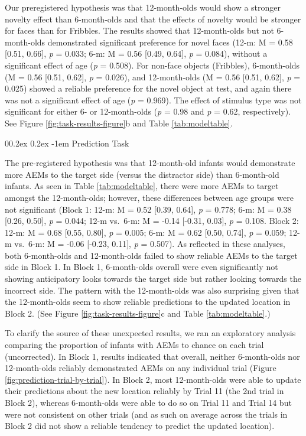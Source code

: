 \documentclass[
  english,
  man,floatsintext]{apa6}
\makeatletter
\let\oldparagraph\paragraph
\renewcommand{\paragraph}{
    \@ifstar
      \xxxParagraphStar
      \xxxParagraphNoStar
  }
\newcommand{\xxxParagraphStar}[1]{\oldparagraph*{#1}\mbox{}}
\newcommand{\xxxParagraphNoStar}[1]{\oldparagraph{#1}\mbox{}}
\renewcommand{\paragraph}{\@startsection{paragraph}{4}{\parindent}%
  {0\baselineskip \@plus 0.2ex \@minus 0.2ex}%
  {-1em}%
  {\normalfont\normalsize\bfseries\itshape\typesectitle}}
\makeatother
\begin{document}
Our preregistered hypothesis was that 12-month-olds would show a stronger novelty effect than 6-month-olds and that the effects of novelty would be stronger for faces than for Fribbles.
The results showed that 12-month-olds but not 6-month-olds demonstrated significant preference for novel faces (12-m: M = 0.58 {[}0.51, 0.66{]}, \emph{p} = 0.033; 6-m: M = 0.56 {[}0.49, 0.64{]}, \emph{p} = 0.084), without a significant effect of age (\emph{p} = 0.508).
For non-face objects (Fribbles), 6-month-olds (M = 0.56 {[}0.51, 0.62{]}, \emph{p} = 0.026), and 12-month-olds (M = 0.56 {[}0.51, 0.62{]}, \emph{p} = 0.025) showed a reliable preference for the novel object at test, and again there was not a significant effect of age (\emph{p} = 0.969).
The effect of stimulus type was not significant for either 6- or 12-month-olds (\emph{p} = 0.98 and \emph{p} = 0.62, respectively).
See Figure \ref{fig:task-results-figure}b and Table \ref{tab:modeltable}.

\paragraph{Prediction Task}\label{prediction-task}

The pre-registered hypothesis was that 12-month-old infants would demonstrate more AEMs to the target side (versus the distractor side) than 6-month-old infants.
As seen in Table \ref{tab:modeltable}, there were more AEMs to target amongst the 12-month-olds; however, these differences between age groups were not significant (Block 1: 12-m: M = 0.52 {[}0.39, 0.64{]}, \emph{p} = 0.778; 6-m: M = 0.38 {[}0.26, 0.50{]}, \emph{p} = 0.044; 12-m vs.~6-m: M = -0.14 {[}-0.31, 0.03{]}, \emph{p} = 0.108.
Block 2: 12-m: M = 0.68 {[}0.55, 0.80{]}, \emph{p} = 0.005; 6-m: M = 0.62 {[}0.50, 0.74{]}, \emph{p} = 0.059; 12-m vs.~6-m: M = -0.06 {[}-0.23, 0.11{]}, \emph{p} = 0.507).
As reflected in these analyses, both 6-month-olds and 12-month-olds failed to show reliable AEMs to the target side in Block 1.
In Block 1, 6-month-olds overall were even significantly not showing anticipatory looks towards the target side but rather looking towards the incorrect side.
The pattern with the 12-month-olds was also surprising given that the 12-month-olds seem to show reliable predictions to the updated location in Block 2.
(See Figure \ref{fig:task-results-figure}c and Table \ref{tab:modeltable}.)

To clarify the source of these unexpected results, we ran an exploratory analysis comparing the proportion of infants with AEMs to chance on each trial (uncorrected).
In Block 1, results indicated that overall, neither 6-month-olds nor 12-month-olds reliably demonstrated AEMs on any individual trial (Figure \ref{fig:prediction-trial-by-trial}).
In Block 2, most 12-month-olds were able to update their predictions about the new location reliably by Trial 11 (the 2nd trial in Block 2), whereas 6-month-olds were able to do so on Trial 11 and Trial 14 but were not consistent on other trials (and as such on average across the trials in Block 2 did not show a reliable tendency to predict the updated location).
\end{document}
